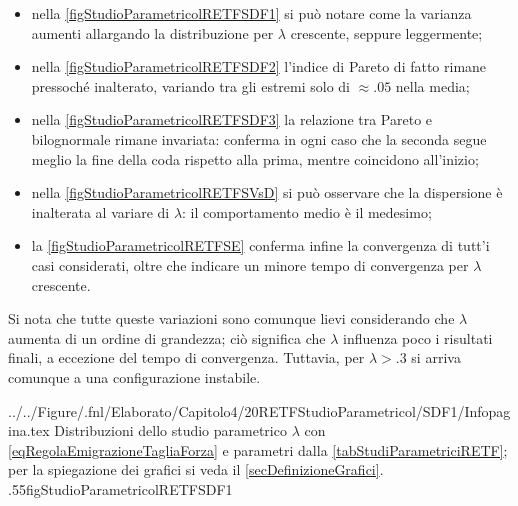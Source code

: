         \begin{itemize}[
          label=\(\diamond\),
        ]
          \item nella \cref{figStudioParametricolRETFSDF1} si può notare come la varianza aumenti allargando la distribuzione per \(\lambda\) crescente, seppure leggermente;
          \item nella \cref{figStudioParametricolRETFSDF2} l'indice di Pareto di fatto rimane pressoché inalterato, variando tra gli estremi solo di \(\approx\num{.05}\) nella media;
          \item nella \cref{figStudioParametricolRETFSDF3} la relazione tra Pareto e bilognormale rimane invariata: conferma in ogni caso che la seconda segue meglio la fine della coda rispetto alla prima, mentre coincidono all'inizio;
          \item nella \cref{figStudioParametricolRETFSVsD} si può osservare che la dispersione è inalterata al variare di \(\lambda\): il comportamento medio è il medesimo;
          \item la \cref{figStudioParametricolRETFSE} conferma infine la convergenza di tutt'i casi considerati, oltre che indicare un minore tempo di convergenza per \(\lambda\) crescente.
        \end{itemize}

        Si nota che tutte queste variazioni sono comunque lievi considerando che \(\lambda\) aumenta di un ordine di grandezza; ciò significa che \(\lambda\) influenza poco i risultati finali, a eccezione del tempo di convergenza. Tuttavia, per \(\lambda>\num{.3}\) si arriva comunque a una configurazione instabile.

            {../../Figure/.fnl/Elaborato/Capitolo4/20RETFStudioParametricol/SDF1/Infopagina.tex}
            {Distribuzioni dello studio parametrico \(\lambda\) con \ref{eqRegolaEmigrazioneTagliaForza} e parametri dalla \cref{tabStudiParametriciRETF}; per la spiegazione dei grafici si veda il \cref{secDefinizioneGrafici}.}
            {.55\linewidth}{figStudioParametricolRETFSDF1}

